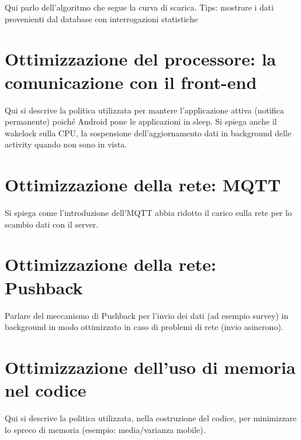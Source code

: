 \documentclass[a4paper,10pt]{memoir}
\begin{document}
Qui parlo dell'algoritmo che segue la curva di scarica. Tips: mostrare i dati provenienti dal database con interrogazioni statistiche

\section{Ottimizzazione del processore: la comunicazione con il front-end}

Qui si descrive la politica utilizzata per mantere l'applicazione attiva (notifica permanente) poiché Android pone le applicazioni in sleep. Si spiega anche il wakelock sulla CPU, la sospensione dell'aggiornamento dati in background delle activity quando non sono in vista.

\section{Ottimizzazione della rete: MQTT}

Si spiega come l'introduzione dell'MQTT abbia ridotto il carico sulla rete per lo scambio dati con il server.

\section{Ottimizzazione della rete: Pushback}

Parlare del meccanismo di Pushback per l'invio dei dati (ad esempio survey) in background in modo ottimizzato in caso di problemi di rete (invio asincrono).

\section{Ottimizzazione dell'uso di memoria nel codice}

Qui si descrive la politica utilizzata, nella costruzione del codice, per minimizzare lo spreco di memoria (esempio: media/varianza mobile).

%
%
%
\end{document}
